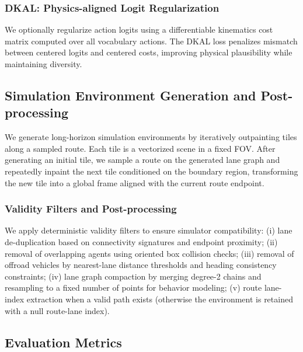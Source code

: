 \documentclass{article}
\theoremstyle{plain}
\theoremstyle{definition}
\theoremstyle{remark}
\begin{document}
\subsubsection{DKAL: Physics-aligned Logit Regularization}

We optionally regularize action logits using a differentiable kinematics cost matrix computed over all vocabulary actions.
The DKAL loss penalizes mismatch between centered logits and centered costs, improving physical plausibility while maintaining diversity.


\subsection{Simulation Environment Generation and Post-processing}
\label{app:simgen}

We generate long-horizon simulation environments by iteratively outpainting tiles along a sampled route. Each tile is a vectorized scene
in a fixed FOV. After generating an initial tile, we sample a route on the generated lane graph and repeatedly inpaint the next tile
conditioned on the boundary region, transforming the new tile into a global frame aligned with the current route endpoint.

\subsubsection{Validity Filters and Post-processing}

We apply deterministic validity filters to ensure simulator compatibility:
(i) lane de-duplication based on connectivity signatures and endpoint proximity;
(ii) removal of overlapping agents using oriented box collision checks;
(iii) removal of offroad vehicles by nearest-lane distance thresholds and heading consistency constraints;
(iv) lane graph compaction by merging degree-2 chains and resampling to a fixed number of points for behavior modeling;
(v) route lane-index extraction when a valid path exists (otherwise the environment is retained with a null route-lane index).


\subsection{Evaluation Metrics}
\label{app:metrics}
\end{document}
